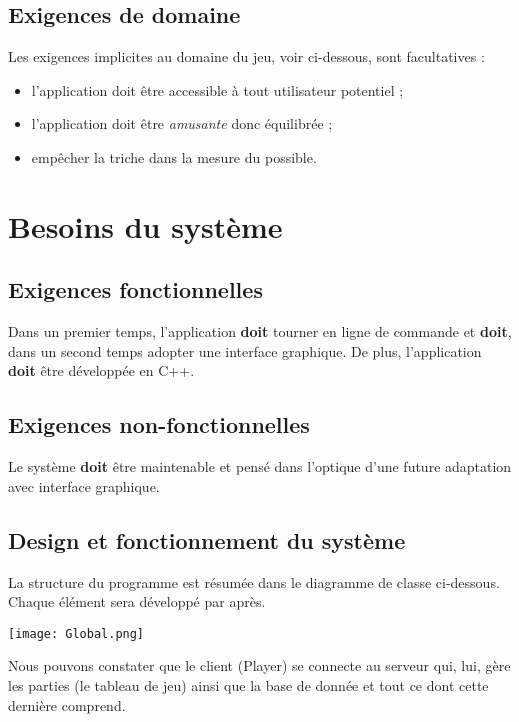 \documentclass{article}
\begin{document}
	\subsection{Exigences de domaine}
		Les exigences implicites au domaine du jeu, voir ci-dessous, sont facultatives :

		\begin{itemize}
			\item l'application doit être accessible à tout utilisateur potentiel ;
			\item l'application doit être \textit{amusante} donc équilibrée ;
			\item empêcher la triche dans la mesure du possible.
		\end{itemize}

\newpage

\section{Besoins du système}
	\subsection{Exigences fonctionnelles}
		Dans un premier temps, l'application \textbf{doit} tourner en ligne de commande et \textbf{doit}, dans un second temps adopter une interface
		graphique.
		De plus, l'application \textbf{doit} être développée en C++.

	\subsection{Exigences non-fonctionnelles}
		Le système \textbf{doit} être maintenable et pensé dans l'optique d'une future adaptation avec interface graphique.

	\subsection{Design et fonctionnement du système}
		La structure du programme est résumée dans le diagramme de classe ci-dessous. Chaque élément sera développé par après.
		\begin{center}\texttt{[image: Global.png]}\end{center}

		Nous pouvons constater que le client (Player) se connecte au serveur qui, lui, gère les parties (le tableau de jeu) ainsi que la base de donnée et tout ce dont cette dernière comprend.
\end{document}
